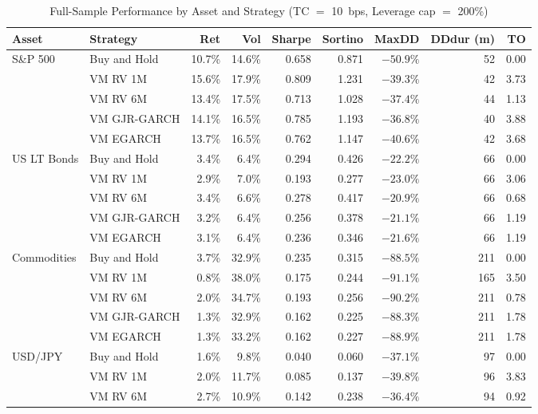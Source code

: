 \documentclass[12pt, a4paper]{article}
\begin{document}
\begin{table}[H]
\centering
\footnotesize
\caption{Full-Sample Performance by Asset and Strategy (TC $=$ 10~bps, Leverage cap $=$ 200\%)}
\label{tab:perf-all}
\begin{tabular}{llrrrrrrr}
\toprule
\textbf{Asset} & \textbf{Strategy} & \textbf{Ret} & \textbf{Vol} & \textbf{Sharpe} & \textbf{Sortino} & \textbf{MaxDD} & \textbf{DDdur (m)} & \textbf{TO}\\
\midrule
\multirow{5}{*}{S\&P 500}
& Buy and Hold   & 10.7\% & 14.6\% & 0.658 & 0.871 & $-50.9\%$ & 52 & 0.00\\
& VM RV 1M       & 15.6\% & 17.9\% & 0.809 & 1.231 & $-39.3\%$ & 42 & 3.73\\
& VM RV 6M       & 13.4\% & 17.5\% & 0.713 & 1.028 & $-37.4\%$ & 44 & 1.13\\
& VM GJR-GARCH   & 14.1\% & 16.5\% & 0.785 & 1.193 & $-36.8\%$ & 40 & 3.88\\
& VM EGARCH      & 13.7\% & 16.5\% & 0.762 & 1.147 & $-40.6\%$ & 42 & 3.68\\
\midrule
\multirow{5}{*}{US LT Bonds}
& Buy and Hold   & 3.4\% & 6.4\% & 0.294 & 0.426 & $-22.2\%$ & 66 & 0.00\\
& VM RV 1M       & 2.9\% & 7.0\% & 0.193 & 0.277 & $-23.0\%$ & 66 & 3.06\\
& VM RV 6M       & 3.4\% & 6.6\% & 0.278 & 0.417 & $-20.9\%$ & 66 & 0.68\\
& VM GJR-GARCH   & 3.2\% & 6.4\% & 0.256 & 0.378 & $-21.1\%$ & 66 & 1.19\\
& VM EGARCH      & 3.1\% & 6.4\% & 0.236 & 0.346 & $-21.6\%$ & 66 & 1.19\\
\midrule
\multirow{5}{*}{Commodities}
& Buy and Hold   & 3.7\% & 32.9\% & 0.235 & 0.315 & $-88.5\%$ & 211 & 0.00\\
& VM RV 1M       & 0.8\% & 38.0\% & 0.175 & 0.244 & $-91.1\%$ & 165 & 3.50\\
& VM RV 6M       & 2.0\% & 34.7\% & 0.193 & 0.256 & $-90.2\%$ & 211 & 0.78\\
& VM GJR-GARCH   & 1.3\% & 32.9\% & 0.162 & 0.225 & $-88.3\%$ & 211 & 1.78\\
& VM EGARCH      & 1.3\% & 33.2\% & 0.162 & 0.227 & $-88.9\%$ & 211 & 1.78\\
\midrule
\multirow{5}{*}{USD/JPY}
& Buy and Hold   & 1.6\% &  9.8\% & 0.040 & 0.060 & $-37.1\%$ & 97 & 0.00\\
& VM RV 1M       & 2.0\% & 11.7\% & 0.085 & 0.137 & $-39.8\%$ & 96 & 3.83\\
& VM RV 6M       & 2.7\% & 10.9\% & 0.142 & 0.238 & $-36.4\%$ & 94 & 0.92\\

\end{tabular}
\end{table}
\end{document}
